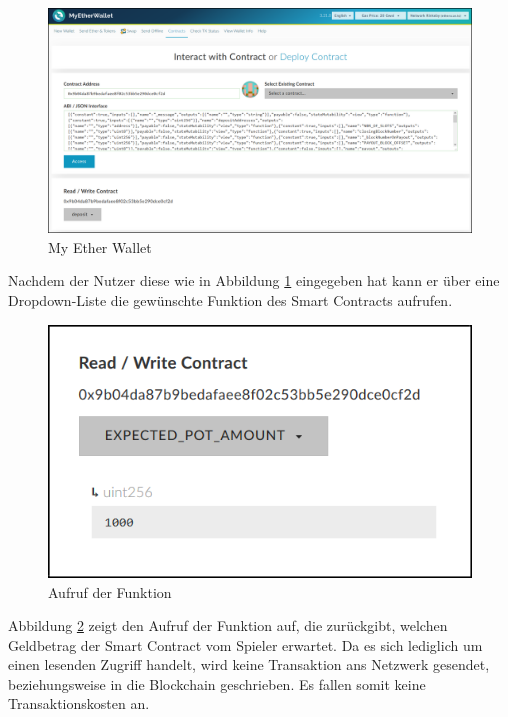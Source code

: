 \begin{figure}[H]
\centering
\includegraphics[width=1\linewidth]{Figures/eth_gui/ETH_wallet}
\decoRule
\caption{My Ether Wallet}
\label{fig:ETH_wallet}
\end{figure}

Nachdem der Nutzer diese wie in Abbildung \ref{fig:ETH_wallet} eingegeben hat kann er über eine Dropdown-Liste die gewünschte Funktion des Smart Contracts aufrufen.

\begin{figure}[H]
\centering
\includegraphics[scale=0.85]{Figures/eth_gui/ETH_wallet_expected_amount}
\decoRule
\caption{Aufruf der  Funktion}
\label{fig:ETH_wallet_expected_amount}
\end{figure}

Abbildung \ref{fig:ETH_wallet_expected_amount} zeigt den Aufruf der Funktion auf, die zurückgibt, welchen Geldbetrag der Smart Contract vom Spieler erwartet. Da es sich lediglich um einen lesenden Zugriff handelt, wird keine Transaktion ans Netzwerk gesendet, beziehungsweise in die Blockchain geschrieben. Es fallen somit keine Transaktionskosten an.

